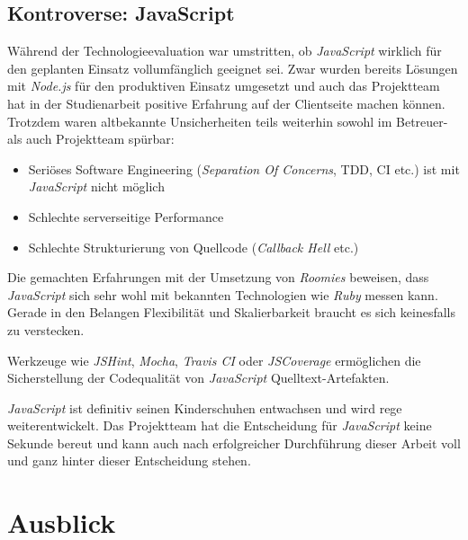 \subsection*{Kontroverse: JavaScript}

Während der Technologieevaluation war umstritten, ob \emph{JavaScript} wirklich für den geplanten Einsatz vollumfänglich geeignet sei. Zwar wurden bereits Lösungen mit \emph{Node.js} für den produktiven Einsatz umgesetzt und auch das Projektteam hat in der Studienarbeit positive Erfahrung auf der Clientseite machen können. Trotzdem waren altbekannte Unsicherheiten teils weiterhin sowohl im Betreuer- als auch Projektteam spürbar:

\begin{itemize}
	\item Seriöses Software Engineering (\emph{Separation Of Concerns}, \gls{TDD}, CI etc.) ist mit \emph{JavaScript} nicht möglich
	\item Schlechte serverseitige Performance
	\item Schlechte Strukturierung von Quellcode (\emph{Callback Hell} etc.)
\end{itemize}

Die gemachten Erfahrungen mit der Umsetzung von \emph{Roomies} beweisen, dass \emph{JavaScript} sich sehr wohl mit bekannten Technologien wie \emph{Ruby} messen kann. Gerade in den Belangen Flexibilität und Skalierbarkeit braucht es sich keinesfalls zu verstecken.

Werkzeuge wie \emph{JSHint}, \emph{Mocha}, \emph{Travis CI} oder \emph{JSCoverage} ermöglichen die Sicherstellung der Codequalität von \emph{JavaScript} Quelltext-Artefakten.

\emph{JavaScript} ist definitiv seinen Kinderschuhen entwachsen und wird rege weiterentwickelt. Das Projektteam hat die Entscheidung für \emph{JavaScript} keine Sekunde bereut und kann auch nach erfolgreicher Durchführung dieser Arbeit voll und ganz hinter dieser Entscheidung stehen.



\section*{Ausblick}


